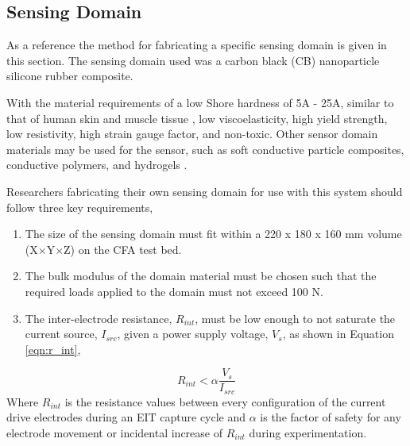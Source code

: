 \subsection{Sensing Domain}
\label{sec:Sensing Domain}


As a reference the method for fabricating a specific sensing domain is given in this section. The sensing domain used was a carbon black (CB) nanoparticle silicone rubber composite.

With the material requirements of a low Shore hardness of 5A - 25A, similar to that of human skin and muscle tissue \cite{Silvera-Tawil2015, Chatzistergos2022}, low viscoelasticity, high yield strength, low resistivity, high strain gauge factor, and non-toxic. Other sensor domain materials may be used for the sensor, such as soft conductive particle composites, conductive polymers, and hydrogels \cite{Giffney2017,Duan2014,Chen2023}.

Researchers fabricating their own sensing domain for use with this system should follow three key requirements, 
\begin{enumerate}
\item The size of the sensing domain must fit within a 220 x 180 x 160 mm volume (X$\times$Y$\times$Z) on the CFA test bed. 
\item The bulk modulus of the domain material must be chosen such that the required loads applied to the domain must not exceed 100 N.
\item The inter-electrode resistance, $R_{int}$, must be low enough to not saturate the current source, $I_{src}$, given a power supply voltage, $V_s$, as shown in Equation \ref{eqn:r_int},
\end{enumerate}
\begin{equation}
R_{int} < \alpha \frac{V_s}{I_{src}}
\label{eqn:r_int}
\end{equation}
Where $R_{int}$ is the resistance values between every configuration of the current drive electrodes during an EIT capture cycle and $\alpha$ is the factor of safety for any electrode movement or incidental increase of $R_{int}$ during experimentation.

